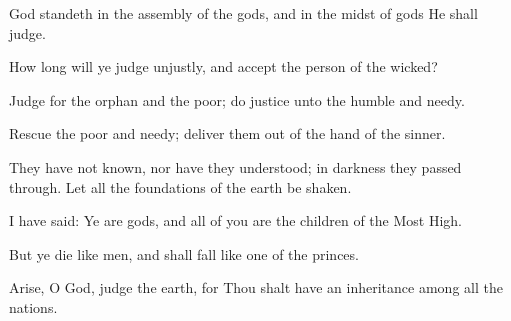 God standeth in the assembly of the gods, and in the midst of gods He shall judge.

How long will ye judge unjustly, and accept the person of the wicked?

Judge for the orphan and the poor; do justice unto the humble and needy.

Rescue the poor and needy; deliver them out of the hand of the sinner.

They have not known, nor have they understood; in darkness they passed through. Let all the foundations of the earth be shaken.

I have said: Ye are gods, and all of you are the children of the Most High.

But ye die like men, and shall fall like one of the princes.

Arise, O God, judge the earth, for Thou shalt have an inheritance among all the nations.
